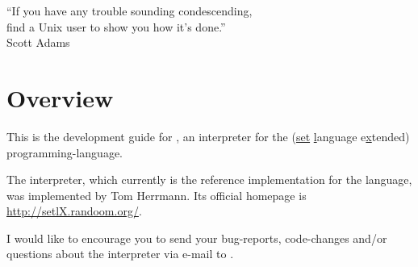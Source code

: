 


\globalDate{\today}
\globalKeywords{}







\begin{titlepage}
\maketitle

\vfill

\begin{center}
\Large
``If you have any trouble sounding condescending,\\
find a Unix user to show you how it's done.''\\
Scott Adams
\end{center}

\vfill
\end{titlepage}

\tableofcontents

\newpage

\section{Overview}

This is the development guide for \setlX, an interpreter for the \SetlX{} (\underline{set} \underline{l}anguage e\underline{x}tended) programming-language.

The \setlX{} interpreter, which currently is the reference implementation for the \SetlX{} language, was implemented by Tom Herrmann. Its official homepage is \url{http://setlX.randoom.org/}.

I would like to encourage you to send your bug-reports, code-changes and\slash{}or questions about the \setlX{} interpreter via e-mail to .

